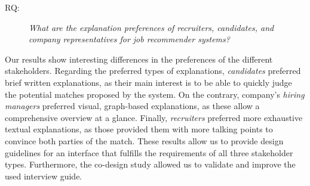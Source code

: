 \begin{description}
    \item[RQ:] \textit{What are the explanation preferences of recruiters, candidates, and company representatives for job recommender systems?}
    \newline
\end{description}

Our results show interesting differences in the preferences of the different stakeholders. Regarding the preferred types of explanations, \textit{candidates} preferred brief written explanations, as their main interest is to be able to quickly judge the potential matches proposed by the system. On the contrary, company's \textit{hiring managers} preferred visual, graph-based explanations, as these allow a comprehensive overview at a glance. Finally, \textit{recruiters} preferred more exhaustive textual explanations, as those provided them with more talking points to convince both parties of the match. These results allow us to provide design guidelines for an interface that fulfills the requirements of all three stakeholder types. Furthermore, the co-design study allowed us to validate and improve the used interview guide. 





